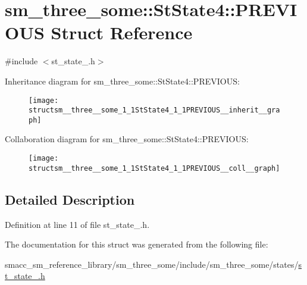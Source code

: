 \hypertarget{structsm__three__some_1_1StState4_1_1PREVIOUS}{}\section{sm\+\_\+three\+\_\+some\+:\+:St\+State4\+:\+:P\+R\+E\+V\+I\+O\+US Struct Reference}
\label{structsm__three__some_1_1StState4_1_1PREVIOUS}


{\ttfamily \#include $<$st\+\_\+state\+\_.\+h$>$}



Inheritance diagram for sm\+\_\+three\+\_\+some\+:\+:St\+State4\+:\+:P\+R\+E\+V\+I\+O\+US\+:
\nopagebreak
\begin{figure}[H]
\begin{center}
\leavevmode
\texttt{[image: structsm\_\_three\_\_some\_1\_1StState4\_1\_1PREVIOUS\_\_inherit\_\_graph]}
\end{center}
\end{figure}


Collaboration diagram for sm\+\_\+three\+\_\+some\+:\+:St\+State4\+:\+:P\+R\+E\+V\+I\+O\+US\+:
\nopagebreak
\begin{figure}[H]
\begin{center}
\leavevmode
\texttt{[image: structsm\_\_three\_\_some\_1\_1StState4\_1\_1PREVIOUS\_\_coll\_\_graph]}
\end{center}
\end{figure}


\subsection{Detailed Description}


Definition at line 11 of file st\+\_\+state\+\_.\+h.



The documentation for this struct was generated from the following file\+:\begin{DoxyCompactItemize}
\item 
smacc\+\_\+sm\+\_\+reference\+\_\+library/sm\+\_\+three\+\_\+some/include/sm\+\_\+three\+\_\+some/states/\hyperlink{st__state__4_8h}{st\+\_\+state\+\_.\+h}\end{DoxyCompactItemize}
